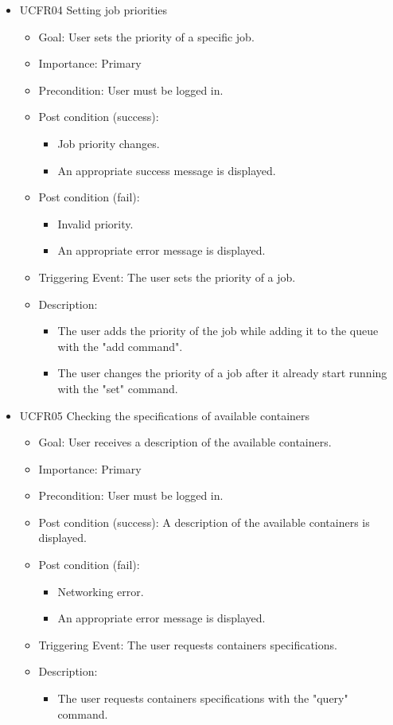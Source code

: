 \begin{itemize}
    \item UCFR04 Setting job priorities
    \begin{itemize}
      \item Goal: User sets the priority of a specific job.
      \item Importance: Primary
      \item Precondition: User must be logged in.
      \item Post condition (success): 
      \begin{itemize}
        \item Job priority changes.
        \item An appropriate success message is displayed.
      \end{itemize}  
      \item Post condition (fail):
      \begin{itemize}
        \item Invalid priority.
        \item An appropriate error message is displayed.
      \end{itemize}
      \item Triggering Event: The user sets the priority of a job.
      \item Description:
      \begin{itemize}
        \item The user adds the priority of the job while adding it to the queue with the "add command".
        \item The user changes the priority of a job after it already start running with the "set" command.
      \end{itemize}
    \end{itemize}


    \item UCFR05 Checking the specifications of available containers
    \begin{itemize}
      \item Goal: User receives a description of the available containers.
      \item Importance: Primary
      \item Precondition: User must be logged in.
      \item Post condition (success): A description of the available containers is displayed.
      \item Post condition (fail):
      \begin{itemize}
        \item Networking error.
        \item An appropriate error message is displayed.
      \end{itemize}
      \item Triggering Event: The user requests containers specifications.
      \item Description:
      \begin{itemize}
        \item The user requests containers specifications with the "query" command.
      \end{itemize}
    \end{itemize}


\end{itemize}
